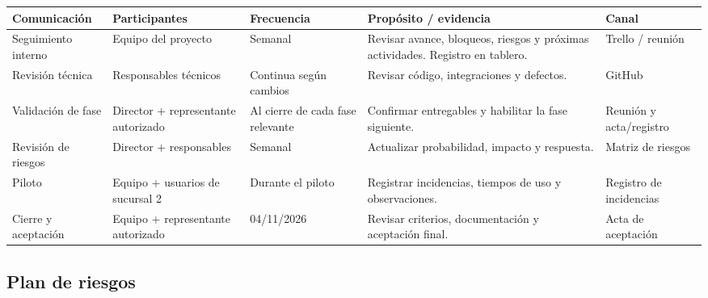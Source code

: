 \documentclass[12pt,a4paper]{article}
\begin{document}
\begin{center}
\renewcommand{\arraystretch}{1.15}
\begin{tabularx}{\textwidth}{|p{3.6cm}|p{3cm}|p{3cm}|X|p{2.5cm}|}
\hline
\rowcolor{tableheader}
\textbf{Comunicación} & \textbf{Participantes} & \textbf{Frecuencia} & \textbf{Propósito / evidencia} & \textbf{Canal} \\ \hline
Seguimiento interno & Equipo del proyecto & Semanal & Revisar avance, bloqueos, riesgos y próximas actividades. Registro en tablero. & Trello / reunión \\ \hline
Revisión técnica & Responsables técnicos & Continua según cambios & Revisar código, integraciones y defectos. & GitHub \\ \hline
Validación de fase & Director + representante autorizado & Al cierre de cada fase relevante & Confirmar entregables y habilitar la fase siguiente. & Reunión y acta/registro \\ \hline
Revisión de riesgos & Director + responsables & Semanal & Actualizar probabilidad, impacto y respuesta. & Matriz de riesgos \\ \hline
Piloto & Equipo + usuarios de sucursal 2 & Durante el piloto & Registrar incidencias, tiempos de uso y observaciones. & Registro de incidencias \\ \hline
Cierre y aceptación & Equipo + representante autorizado & 04/11/2026 & Revisar criterios, documentación y aceptación final. & Acta de aceptación \\ \hline
\end{tabularx}
\end{center}

\subsection{Plan de riesgos}
\end{document}
